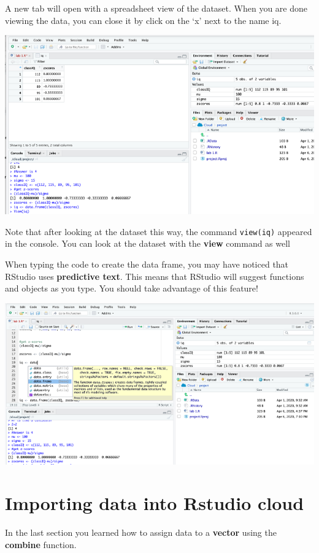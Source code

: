 \documentclass[
]{book}
\begin{document}
A new tab will open with a spreadsheet view of the dataset. When you are done viewing the data, you can close it by click on the `x' next to the name iq.

\includegraphics{img/dataframe2.png}

Note that after looking at the dataset this way, the command \texttt{view(iq)} appeared in the console. You can look at the dataset with the \textbf{view} command as well

When typing the code to create the data frame, you may have noticed that RStudio uses \textbf{predictive text}. This means that RStudio will suggest functions and objects as you type. You should take advantage of this feature!

\includegraphics{img/autofill.png}

\hypertarget{importing-data-into-rstudio-cloud}{%
\section{Importing data into Rstudio cloud}\label{importing-data-into-rstudio-cloud}}

In the last section you learned how to assign data to a \textbf{vector} using the \textbf{combine} function.
\end{document}
